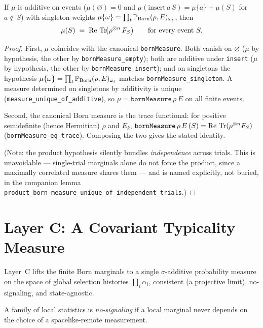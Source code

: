 \begin{theorem}
  \label{thm:born-unique}
  \leanok
  If $\mu$ is additive on events ($\mu(\varnothing)=0$ and
  $\mu(\mathrm{insert}\,a\,S)=\mu\{a\}+\mu(S)$ for $a\notin S$) with singleton weights
  $\mu\{\omega\} = \prod_t \mathbb{P}_{\mathrm{Born}}(\rho,E)_{\omega_t}$, then
  \[
    \mu(S) \;=\; \operatorname{Re} \,\operatorname{Tr}\!\bigl( \rho^{\otimes n}\, F_S \bigr)
    \qquad\text{for every event } S .
  \]
\end{theorem}

\begin{proof}
  \leanok
  First, $\mu$ coincides with the canonical \texttt{bornMeasure}. Both vanish on
  $\varnothing$ ($\mu$ by hypothesis, the other by \texttt{bornMeasure\_empty}); both
  are additive under \texttt{insert} ($\mu$ by hypothesis, the other by
  \texttt{bornMeasure\_insert}); and on singletons the hypothesis $\mu\{\omega\} =
  \prod_t \mathbb{P}_{\mathrm{Born}}(\rho,E)_{\omega_t}$ matches \texttt{bornMeasure\_singleton}. A measure
  determined on singletons by additivity is unique
  (\texttt{measure\_unique\_of\_additive}), so $\mu = \texttt{bornMeasure}\,\rho\,E$
  on all finite events.

  Second, the canonical Born measure is the trace functional: for positive
  semidefinite (hence Hermitian) $\rho$ and $E_k$,
  $\texttt{bornMeasure}\,\rho\,E\,(S) = \operatorname{Re}\,\operatorname{Tr}(\rho^{\otimes n} F_S)$
  (\texttt{bornMeasure\_eq\_trace}). Composing the two gives the stated identity.

  (Note: the product hypothesis silently bundles \emph{independence} across trials.
  This is unavoidable --- single-trial marginals alone do not force the product, since
  a maximally correlated measure shares them --- and is named explicitly, not buried,
  in the companion lemma \texttt{product\_born\_measure\_unique\_of\_independent\_trials}.)
\end{proof}


\chapter{Layer C: A Covariant Typicality Measure}
\label{chap:layerC}

Layer~C lifts the finite Born marginals to a single $\sigma$-additive probability
measure on the space of global selection histories $\prod_i \alpha_i$, consistent
(a projective limit), no-signaling, and state-agnostic.

\begin{definition}
  \label{def:no-signaling}
  A family of local statistics is \emph{no-signaling} if a local marginal never
  depends on the choice of a spacelike-remote measurement.
\end{definition}

